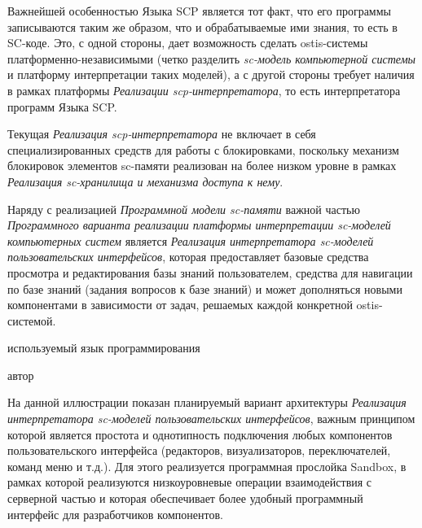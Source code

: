 Важнейшей особенностью Языка SCP является тот факт, что его программы записываются таким же образом, что и обрабатываемые
ими знания, то есть в SC-коде. Это, с одной стороны, дает возможность сделать ostis-системы платформенно-независимыми
(четко разделить \textit{sc-модель компьютерной системы} и платформу интерпретации таких моделей), а с другой стороны
требует наличия в рамках платформы \textit{Реализации scp-интерпретатора}, то есть интерпретатора программ Языка SCP.

Текущая \textit{Реализация scp-интерпретатора} не включает в себя специализированных средств для работы с блокировками,
поскольку механизм блокировок элементов sc-памяти реализован на более низком уровне в рамках \textit{Реализация
sc-хранилища и механизма доступа к нему}.

Наряду с реализацией \textit{Программной модели sc-памяти} важной частью \textit{Программного варианта реализации платформы
интерпретации sc-моделей компьютерных систем} является \textit{Реализация интерпретатора sc-моделей пользовательских
интерфейсов}, которая предоставляет базовые средства просмотра и редактирования базы знаний пользователем, средства для
навигации по базе знаний (задания вопросов к базе знаний) и может дополняться новыми компонентами в зависимости от задач,
решаемых каждой конкретной ostis-системой.

\begin{SCn}
\begin{scnrelfromlist}{используемый язык программирования}
\end{scnrelfromlist}
\begin{scnrelfromlist}{автор}
\end{scnrelfromlist}
\end{SCn}

На данной иллюстрации показан планируемый вариант архитектуры \textit{Реализация интерпретатора sc-моделей пользовательских
интерфейсов}, важным принципом которой является простота и однотипность подключения любых компонентов пользовательского
интерфейса (редакторов, визуализаторов, переключателей, команд меню и т.д.). Для этого реализуется программная прослойка
Sandbox, в рамках которой реализуются низкоуровневые операции взаимодействия с серверной частью и которая обеспечивает
более удобный программный интерфейс для разработчиков компонентов.

